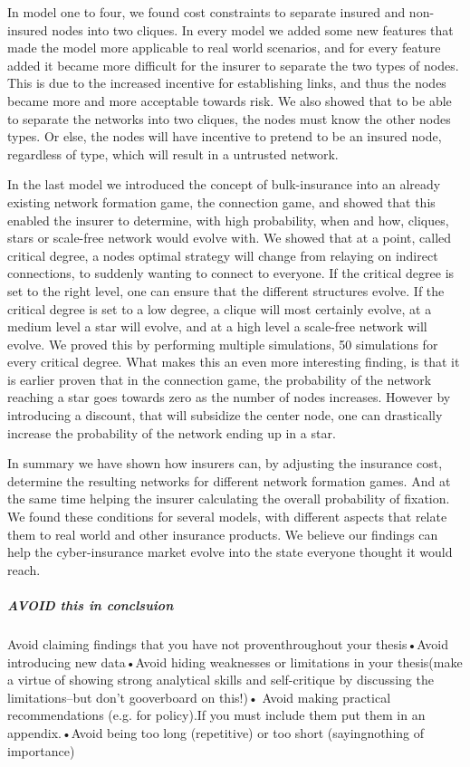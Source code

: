 In model one to four, we found cost constraints to separate insured and non-insured nodes into two cliques. 
In every model we added some new features that made the model more applicable to real world scenarios, and for every feature added it became more difficult for the insurer to separate the two types of nodes. This is due to the increased incentive for establishing links, and thus the nodes became more and more acceptable towards risk. 
We also showed that to be able to separate the networks into two cliques, the nodes must know the other nodes types. Or else, the nodes will have incentive to pretend to be an insured node, regardless of type, which will result in a untrusted network. 

In the last model we introduced the concept of bulk-insurance into an already existing network formation game, the connection game, and showed that this enabled the insurer to determine, with high probability, when and how, cliques, stars or scale-free network would evolve with. We showed that at a point, called critical degree, a nodes optimal strategy will change from relaying on indirect connections, to suddenly wanting to connect to everyone. If the critical degree is set to the right level, one can ensure that the different structures evolve. If the critical degree is set to a low degree, a clique will most certainly evolve, at a medium level a star will evolve, and at a high level a scale-free network will evolve. We proved this by performing multiple simulations, 50 simulations for every critical degree.  
What makes this an even more interesting finding, is that it is earlier proven that in the connection game, the probability of the network reaching a star goes towards zero as the number of nodes increases. However by introducing a discount, that will subsidize the center node, one can drastically increase the probability of the network ending up in a star.

In summary we have shown how insurers can, by adjusting the insurance cost, determine the resulting networks for different network formation games. And at the same time helping the insurer calculating the overall probability of fixation.
We found these conditions for several models, with different aspects that relate them to real world and other insurance products. We believe our findings can help the cyber-insurance market evolve into the state everyone thought it would reach.

\subparagraph{AVOID this in conclsuion}
Avoid claiming findings that you have not proventhroughout your thesis•Avoid introducing new data•Avoid hiding weaknesses or limitations in your thesis(make a virtue of showing strong analytical skills and self-critique by discussing the limitations--but don’t gooverboard on this!)• Avoid making practical recommendations (e.g. for policy).If you must include them put them in an appendix.•Avoid being too long (repetitive) or too short (sayingnothing of importance)
